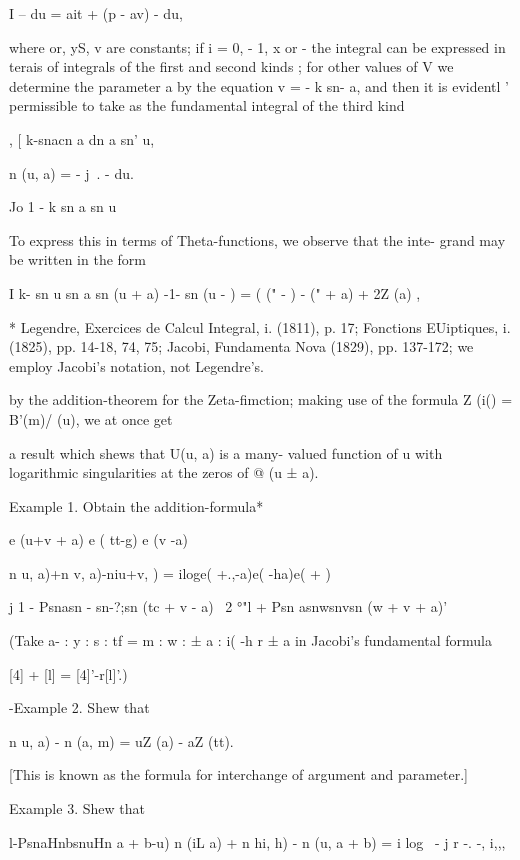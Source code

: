 I -- du = ait + (p - av) - du,

where or, yS, v are constants; if i = 0, - 1, x or - the integral
can be expressed in terais of integrals of the first and second kinds
; for other values of V we determine the parameter a by the equation v
= - k sn- a, and then it is evidentl ' permissible to take as the
fundamental integral of the third kind

, [ k-snacn a dn a sn' u,

n (u, a) = - j~. - du.

  Jo 1 - k sn a sn u

To express this in terms of Theta-functions, we observe that the inte-
grand may be written in the form

I k- sn u sn a sn (u + a) -1- sn (u - ) = ( (" - ) - (" + a) + 2Z (a)
,

* Legendre, Exercices de Calcul Integral, i. (1811), p. 17; Fonctions
EUiptiques, i. (1825), pp. 14-18, 74, 75; Jacobi, Fundamenta Nova
(1829), pp. 137-172; we employ Jacobi's notation, not Legendre's.

%
%

by the addition-theorem for the Zeta-fimction; making use of the
formula Z (i() = B'(m)/ (u), we at once get

a result which shews that U(u, a) is a many- valued function of u with
logarithmic singularities at the zeros of @ (u ± a).

Example 1. Obtain the addition-formula*

e (u+v + a) e ( tt-g) e (v -a)

n u, a)+n v, a)-niu+v, ) = iloge( +.,-a)e( -ha)e( + )

j 1 - Psnasn - sn-?;sn (tc + v - a) ~2 °"l + Psn asnwsnvsn (w + v +
a)'


(Take a- : y : s : tf = m : w : ± a : i( -h r ± a in Jacobi's
fundamental formula

[4] + [l] = [4]'-r[l]'.)

-Example 2. Shew that

n u, a) - n (a, m) = uZ (a) - aZ (tt).


[This is known as the formula for interchange of argument and
parameter.]

Example 3. Shew that

l-PsnaHnbsnuHn a + b-u) n (iL a) + n hi, h) - n (u, a + b) = i log \,
- j r -. -, i,,,\

